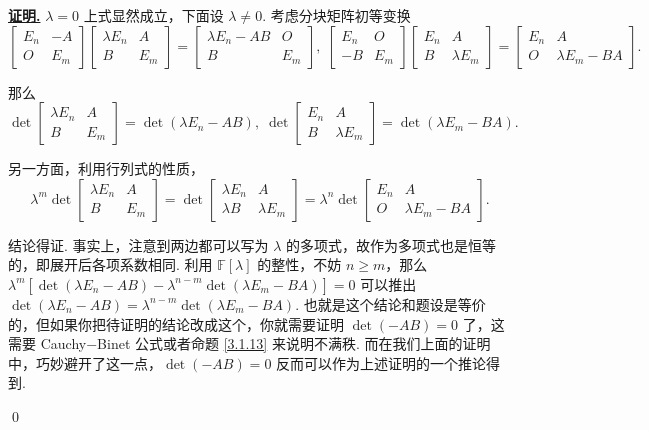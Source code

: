 \documentclass[10pt,openany]{article}
\theoremstyle{thmstyle} %
\theoremstyle{defstyle} %
\theoremstyle{prostyle} %
\theoremstyle{exastyle}
\theoremstyle{remstyle}
\renewenvironment{proof}[1][证明]{\par\underline{\textbf{#1.}} \;\fangsong}{\qed\par}
\newcommand{\F}{\mathbb{F}}
\begin{document}
\begin{proof}
	\( \lambda=0 \) 上式显然成立，下面设 \( \lambda \neq 0 \). 考虑分块矩阵初等变换
	\[ \begin{bmatrix}
		E_n & -A  \\
		O & E_m
	\end{bmatrix} \begin{bmatrix}
		 \lambda E_n & A \\
		 B & E_m
	\end{bmatrix}=\begin{bmatrix}
	\lambda E_n-AB & O  \\
	B & E_m
	\end{bmatrix}, \; \begin{bmatrix}
	E_n & O   \\
	-B & E_m
	\end{bmatrix} \begin{bmatrix}
	 E_n & A \\
	B & \lambda E_m
	\end{bmatrix}=\begin{bmatrix}
	E_n & A  \\
	O & \lambda E_m-BA
	\end{bmatrix}.   \]
	
	那么
	\[  \det \begin{bmatrix}
		\lambda E_n & A \\
		B & E_m
	\end{bmatrix}= \det(\lambda E_n - AB), \; \det \begin{bmatrix}
	E_n & A \\
	B & \lambda E_m
	\end{bmatrix}= \det(\lambda E_m - BA). \]
	
	另一方面，利用行列式的性质，
	\[ \lambda^m \det \begin{bmatrix}
		\lambda E_n & A \\
		B & E_m
	\end{bmatrix}= \det \begin{bmatrix}
	\lambda E_n & A \\
	 \lambda B & \lambda E_m
	\end{bmatrix}= \lambda^n \det \begin{bmatrix}
	E_n & A  \\
	O & \lambda E_m-BA
	\end{bmatrix}. \]
	
	结论得证. 事实上，注意到两边都可以写为 \( \lambda \) 的多项式，故作为多项式也是恒等的，即展开后各项系数相同. 利用 \( \F[\lambda] \) 的整性，不妨 \( n \geq m \)，那么 \( \lambda^m[\det(\lambda E_n - AB)-\lambda^{n-m}\det(\lambda E_m - BA)]=0 \) 可以推出 \( \det(\lambda E_n - AB)=\lambda^{n-m}\det(\lambda E_m - BA) \). 也就是这个结论和题设是等价的，但如果你把待证明的结论改成这个，你就需要证明 \( \det (-AB)=0 \) 了，这需要 Cauchy\(-\)Binet 公式或者命题 \ref{3.1.13} 来说明不满秩. 而在我们上面的证明中，巧妙避开了这一点，\( \det (-AB)=0 \)  反而可以作为上述证明的一个推论得到.
	
	
\end{proof}
\end{document}

